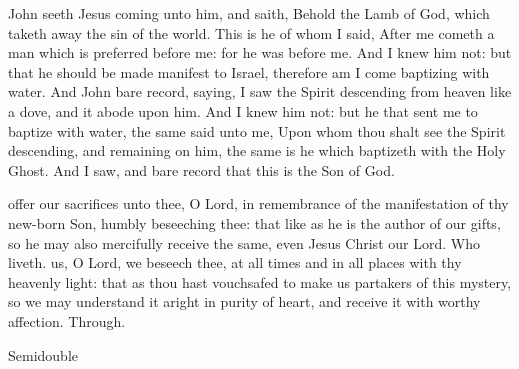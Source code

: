  John seeth Jesus coming unto him, and saith, Behold the Lamb of God, which taketh away the sin of the world. This is he of whom I said, After me cometh a man which is preferred before me: for he was before me. And I knew him not: but that he should be made manifest to Israel, therefore am I come baptizing with water. And John bare record, saying, I saw the Spirit descending from heaven like a dove, and it abode upon him. And I knew him not: but he that sent me to baptize with water, the same said unto me, Upon whom thou shalt see the Spirit descending, and remaining on him, the same is he which baptizeth with the Holy Ghost. And I saw, and bare record that this is the Son of God.

\secret
{} offer our sacrifices unto thee, O Lord, in remembrance of the manifestation of thy new-born Son, humbly beseeching thee: that like as he is the author of our gifts, so he may also mercifully receive the same, even Jesus Christ our Lord. Who liveth.
\postcommunion
{} us, O Lord, we beseech thee, at all times and in all places with thy heavenly light: that as thou hast vouchsafed to make us partakers of this mystery, so we may understand it aright in purity of heart, and receive it with worthy affection. Through.

\label{EpiphanyII}
\begin{inhead}
{Semidouble}
\end{inhead}
\par\noindent
{}

